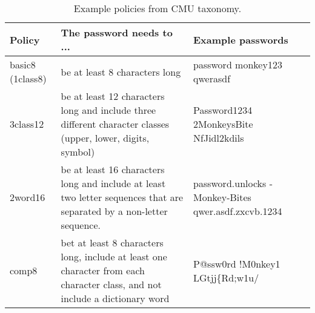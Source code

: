 \begin{table}[htbp]
  \centering
  \caption{\label{tab:rw:policy-descriptions} Example policies from CMU taxonomy. }
    \begin{tabular}{lp{7.5cm}p{4cm}}
    \textbf{Policy} & \textbf{The password needs to ...} & \textbf{Example passwords} \\ \hline \hline
    basic8 (1class8) & be at least 8 characters long & password \linebreak monkey123 \linebreak qwerasdf \\ \hline
    3class12 & be at least 12 characters long and include three different character classes (upper, lower, digits, symbol) & Password1234 \linebreak 2MonkeysBite \linebreak NfJidl2kdils \\ \hline
    2word16 & be at least 16 characters long and include at least two letter sequences that are separated by a non-letter sequence. & password.unlocks \linebreak 1-Monkey-Bites \linebreak qwer.asdf.zxcvb.1234 \\ \hline
        comp8 & bet at least 8 characters long, include at least one character from each character class, and not include a dictionary word & P@ssw0rd \linebreak !M0nkey1 \linebreak LGtjj\{Rd;w1u/ \\ \hline \hline
    \end{tabular}%
\end{table}%
